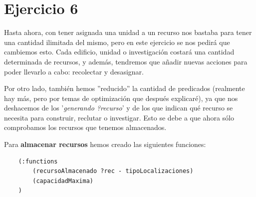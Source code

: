 \documentclass[11pt,a4paper]{article}
\begin{document}
\section*{Ejercicio 6}
Hasta ahora, con tener asignada una unidad a un recurso nos bastaba para tener una cantidad ilimitada del mismo, pero en este
ejercicio se nos pedirá que cambiemos esto. Cada edificio, unidad o investigación costará una cantidad determinada de recursos,
y además, tendremos que añadir nuevas acciones para poder llevarlo a cabo: recolectar y desasignar.

Por otro lado, también hemos ''reducido'' la cantidad de predicados (realmente hay más, pero por temas de optimización que
después explicaré), ya que nos deshacemos de los '\textit{generando ?recurso}' y de los que indican qué recurso se necesita
para construir, reclutar o investigar. Esto se debe a que ahora sólo comprobamos los recursos que tenemos almacenados.

Para \textbf{almacenar recursos} hemos creado las siguientes funciones:
\begin{lstlisting}
    (:functions 
        (recursoAlmacenado ?rec - tipoLocalizaciones)
        (capacidadMaxima)
    )
\end{lstlisting}
\end{document}
